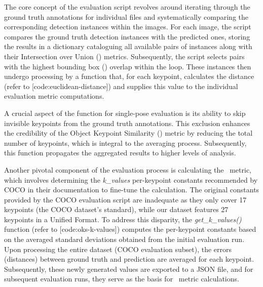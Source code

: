 The core concept of the evaluation script revolves around iterating through the ground truth annotations for individual files and systematically comparing the corresponding detection instances within the images. For each image, the script compares the ground truth detection instances with the predicted ones, storing the results in a dictionary cataloguing all available pairs of instances along with their Intersection over Union (\IoU) metrics. Subsequently, the script selects pairs with the highest bounding box (\BBOX) overlap within the loop. These instances then undergo processing by a function that, for each keypoint, calculates the distance (refer to [code:euclidean-distance]) and supplies this value to the individual evaluation metric computations.


A crucial aspect of the function for single-pose evaluation is its ability to skip invisible keypoints from the ground truth annotations. This exclusion enhances the credibility of the Object Keypoint Similarity (\OKS) metric by reducing the total number of keypoints, which is integral to the averaging process. Subsequently, this function propagates the aggregated results to higher levels of analysis.

Another pivotal component of the evaluation process is calculating the \OKS\ metric, which involves determining the {\it k_values} per-keypoint constants recommended by COCO in their documentation to fine-tune the calculation. The original constants provided by the COCO evaluation script are inadequate as they only cover 17 keypoints (the COCO dataset's standard), while our dataset features 27 keypoints in a Unified Format. To address this disparity, the {\it get_k_values()} function (refer to [code:oks-k-values]) computes the per-keypoint constants based on the averaged standard deviations obtained from the initial evaluation run. Upon processing the entire dataset (COCO evaluation subset), the errors (distances) between ground truth and prediction are averaged for each keypoint. Subsequently, these newly generated values are exported to a JSON file, and for subsequent evaluation runs, they serve as the basis for \OKS\ metric calculations.

